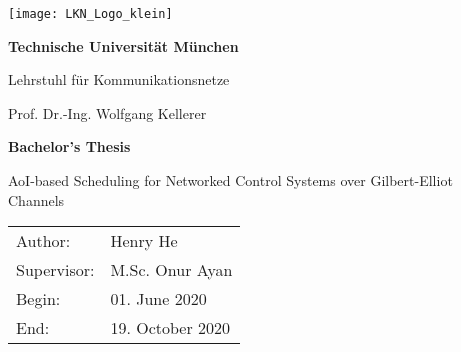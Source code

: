 \thispagestyle{empty}
\newpage

\vspace{5cm}
  \begin{center}
        \texttt{[image: LKN\_Logo\_klein]}
  \end{center}

\begin{center} {\sf\bf 
                               \Large  Technische Universität München
                                \smallskip

                               \Large Lehrstuhl für Kommunikationsnetze
                               \smallskip
                              }

                              {\sf \large Prof. Dr.-Ing. Wolfgang Kellerer} 
\end{center}  

\vspace{4cm}

\begin{center}
        {\bf\Huge Bachelor's Thesis} %
\end{center}

\begin{center}
        \settowidth{\baselineskip}{0.4cm}
        {\LARGE 
        AoI-based Scheduling for Networked Control Systems over Gilbert-Elliot Channels 
        }
\end{center}

\vfill         
{\settowidth{\baselineskip}{0.2cm}
\large\begin{tabular}[l]{ll}
Author: & Henry He\\
Supervisor: & M.Sc. Onur Ayan\\
Begin: & 01. June 2020\\
End: & 19. October 2020
\end{tabular}}
